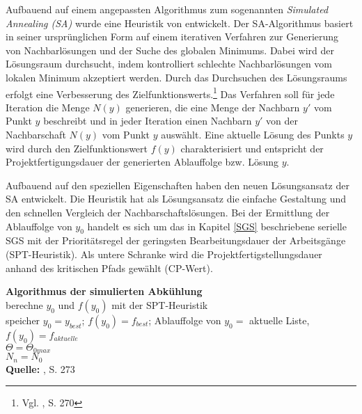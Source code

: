 \documentclass[a4paper,12pt,normalheadings,footexclude,headinclude,liststotoc,nochapterprefix,onecolumn,oneside,parskip,pointlessnumbers]{scrreprt}
\begin{document}
Aufbauend auf einem angepassten Algorithmus zum sogenannten \textit{Simulated Annealing (SA)} wurde eine Heuristik von \cite{bouleimen2003new} entwickelt. Der SA-Algorithmus basiert in seiner ursprünglichen Form auf einem iterativen Verfahren zur Generierung von Nachbarlösungen und der Suche des globalen Minimums. Dabei wird der Lösungsraum durchsucht, indem kontrolliert schlechte Nachbarlösungen vom lokalen Minimum akzeptiert werden. Durch das Durchsuchen des Lösungsraums erfolgt eine Verbesserung des Zielfunktionswerts.\footnote{Vgl. \cite{bouleimen2003new}, S. 270\label{boulemen}} Das Verfahren soll für jede Iteration die Menge $N(y)$ generieren, die eine Menge der Nachbarn $y'$ vom Punkt $y$ beschreibt und in jeder Iteration einen Nachbarn $y'$ von der Nachbarschaft $N(y)$ vom Punkt $y$ auswählt. Eine aktuelle Lösung des Punkts $y$ wird durch den Zielfunktionswert $f(y)$ charakterisiert und entspricht der Projektfertigungsdauer der generierten Ablauffolge bzw. Lösung $y$.

Aufbauend auf den speziellen Eigenschaften %
haben \cite{bouleimen2003new} den neuen Lösungsansatz der SA entwickelt. Die Heuristik hat als Lösungsansatz die einfache Gestaltung und den schnellen Vergleich der Nachbarschaftslösungen. Bei der Ermittlung der Ablauffolge von $y_{0}$ handelt es sich um das in Kapitel \ref{SGS} beschriebene serielle SGS mit der Prioritätsregel der geringsten Bearbeitungsdauer der Arbeitsgänge (SPT-Heuristik). Als untere Schranke wird die Projektfertigstellungsdauer anhand des kritischen Pfads gewählt (CP-Wert).

\begin{algorithm}[H]
\textbf{Algorithmus der simulierten Abkühlung}\\
berechne $y_{0}$ und $f(y_{0})${ mit der SPT-Heuristik\\
speicher $y_{0}=y_{best}$; $f(y_{0})=f_{best}$; Ablauffolge von $y_{0}=$ aktuelle Liste,  $f(y_{0})=f_{aktuelle}$\\
{{
$\Theta= \Theta_{0max}$\\
$N_{n}=N_{0}$\\
}}}
{\footnotesize \textbf{Quelle:} \cite{bouleimen2003new}, S. 273}
\end{algorithm}
\end{document}
